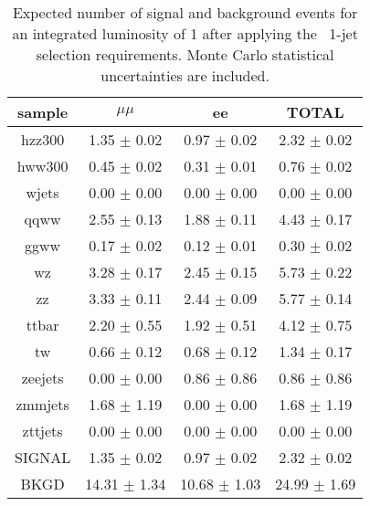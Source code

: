 \begin{table}[!ht]
\begin{center}
\begin{tabular}{c|c|c|c}
\hline
sample    & $\mu\mu$    & ee     & TOTAL\\ \hline 
hzz300   & 1.35 $\pm$ 0.02   & 0.97 $\pm$ 0.02   & 2.32 $\pm$ 0.02 \\ \hline 
hww300   & 0.45 $\pm$ 0.02   & 0.31 $\pm$ 0.01   & 0.76 $\pm$ 0.02 \\ \hline 
wjets   & 0.00 $\pm$ 0.00   & 0.00 $\pm$ 0.00   & 0.00 $\pm$ 0.00 \\ \hline 
qqww   & 2.55 $\pm$ 0.13   & 1.88 $\pm$ 0.11   & 4.43 $\pm$ 0.17 \\ \hline 
ggww   & 0.17 $\pm$ 0.02   & 0.12 $\pm$ 0.01   & 0.30 $\pm$ 0.02 \\ \hline 
wz   & 3.28 $\pm$ 0.17   & 2.45 $\pm$ 0.15   & 5.73 $\pm$ 0.22 \\ \hline 
zz   & 3.33 $\pm$ 0.11   & 2.44 $\pm$ 0.09   & 5.77 $\pm$ 0.14 \\ \hline 
ttbar   & 2.20 $\pm$ 0.55   & 1.92 $\pm$ 0.51   & 4.12 $\pm$ 0.75 \\ \hline 
tw   & 0.66 $\pm$ 0.12   & 0.68 $\pm$ 0.12   & 1.34 $\pm$ 0.17 \\ \hline 
zeejets   & 0.00 $\pm$ 0.00   & 0.86 $\pm$ 0.86   & 0.86 $\pm$ 0.86 \\ \hline 
zmmjets   & 1.68 $\pm$ 1.19   & 0.00 $\pm$ 0.00   & 1.68 $\pm$ 1.19 \\ \hline 
zttjets   & 0.00 $\pm$ 0.00   & 0.00 $\pm$ 0.00   & 0.00 $\pm$ 0.00 \\ \hline 
SIGNAL   & 1.35 $\pm$ 0.02   & 0.97 $\pm$ 0.02   & 2.32 $\pm$ 0.02 \\ \hline 
BKGD   & 14.31 $\pm$ 1.34   & 10.68 $\pm$ 1.03   & 24.99 $\pm$ 1.69 \\ \hline 
\end{tabular}
\caption{Expected number of signal and background events for an 
  integrated luminosity of 1\ifb{} after applying the \ww\ 
  1-jet selection requirements. Monte Carlo statistical 
  uncertainties are included.}
\label{tab:mcyield_zzsel_1j}
\end{center}
\end{table}

